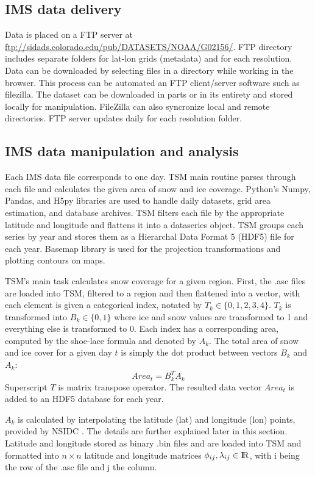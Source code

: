 \subsection{IMS data delivery}

Data is placed on a FTP server at \url{ftp://sidads.colorado.edu/pub/DATASETS/NOAA/G02156/}. FTP directory includes separate folders for lat-lon grids (metadata) and for each resolution. Data can be downloaded by selecting files in a directory while working in the browser. This process can be automated an FTP client/server software such as \gls{filezilla}. The dataset can be downloaded in parts or in its entirety and stored locally for manipulation. FileZilla can also syncronize local and remote directories. FTP server updates daily for each resolution folder.

\subsection{IMS data manipulation and analysis}

Each IMS data file corresponds to one day. TSM main routine parses through each file and calculates the given area of snow and ice coverage. Python's Numpy, Pandas, and H5py libraries are used to handle daily datasets, grid area estimation, and database archives. TSM filters each file by the appropriate latitude and longitude and flattens it into a \gls{dataseries} object. TSM groups each series by year and stores them as a Hierarchal Data Format 5 (HDF5) file for each year. Basemap library is used for the projection transformations and plotting contours on maps.

TSM's main task calculates snow coverage for a given region. First, the .asc files are loaded into TSM, filtered to a region and then flattened into a vector, with each element is given a categorical index, notated by $T_k \in \{0,1,2,3,4\}$. $T_k$ is transformed into $B_k \in \{0, 1 \}$ where ice and snow values are transformed to 1 and everything else is transformed to 0. Each index has a corresponding area, computed by the shoe-lace formula and denoted by $A_k$.
The total area of snow and ice cover for a given day $t$ is simply the dot product between vectors $B_k$ and $A_k$:
\begin{equation}
Area_t  = B_k^{T}A_k
\end{equation}
Superscript $T$ is matrix transpose operator. The resulted data vector
$Area_t$ is added to an HDF5 database for each year.

$A_k$ is calculated by interpolating the latitude (lat) and longitude (lon) points, provided by NSIDC \cite{NIC}. The details are further explained later in this section. Latitude and longitude stored as binary .bin files and are loaded into TSM and formatted into $n \times n$ latitude and longitude matrices $\phi_{ij}, \lambda_{ij} \in {\rm I\!R}$, with i being the row of the .asc file and j the column.

